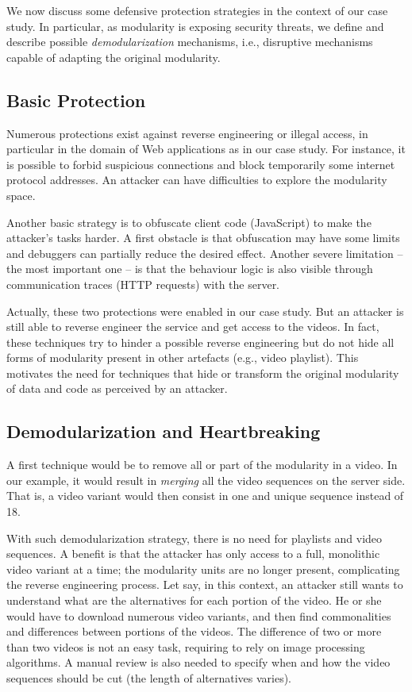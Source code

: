 
We now discuss some defensive protection strategies in the context of our case study. 
In particular, as modularity is exposing security threats, we define and describe possible \emph{demodularization} mechanisms, i.e., disruptive mechanisms capable of adapting the original modularity.

\subsection{Basic Protection}

Numerous protections exist against reverse engineering or illegal access, in particular in the domain of Web applications as in our case study.
For instance, it is possible to forbid suspicious connections and block temporarily some internet protocol addresses. 
An attacker can have difficulties to explore the modularity space. 

Another basic strategy is to obfuscate client code (JavaScript) to make the attacker's tasks harder. 
A first obstacle is that obfuscation may have some limits and debuggers can partially reduce the desired effect. Another severe limitation -- the most important one -- is that the behaviour logic is also visible through communication traces (HTTP requests) with the server. 
 
Actually, these two protections were enabled in our case study. But an attacker is still able to reverse engineer the service and get access to the videos. 
In fact, these techniques try to hinder a possible reverse engineering but do not hide all forms of modularity present in other artefacts (e.g., video playlist).
This motivates the need for techniques that hide or transform the original modularity of data and code as perceived by an attacker.

\subsection{Demodularization and Heartbreaking} 

A first technique would be to remove all or part of the modularity in a video.
In our example, it would result in \emph{merging} all the video sequences on the server side. 
That is, a video variant would then consist in one and unique sequence instead of 18. 

With such demodularization strategy, there is no need for playlists and video sequences. 
A benefit is that the attacker has only access to a full, monolithic video variant at a time; the modularity units are no longer present, complicating the reverse engineering process. %
 Let say, in this context, an attacker still wants to understand what are the alternatives for each portion of the video. He or she would have to download numerous video variants, and then find commonalities and differences between portions of the videos. The difference of two or more than two videos is not an easy task, requiring to rely on image processing algorithms. A manual review is also needed to specify when and how the video sequences should be cut (the length of alternatives varies). 
 
